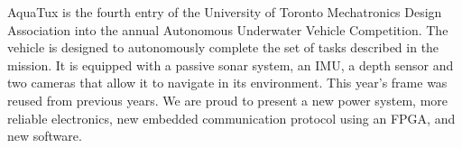 
AquaTux is the fourth entry of the University of Toronto Mechatronics
Design Association into the annual Autonomous Underwater Vehicle
Competition.  The vehicle is designed to autonomously complete
the set of tasks described in the mission\footnotemark[1]. It is
equipped with a passive sonar system, an IMU, a depth sensor and
two cameras that allow it to navigate in its environment. This
year's frame was reused from previous years.
We are proud to present a new power system, more reliable electronics,
new embedded communication protocol using an FPGA, and new software.
